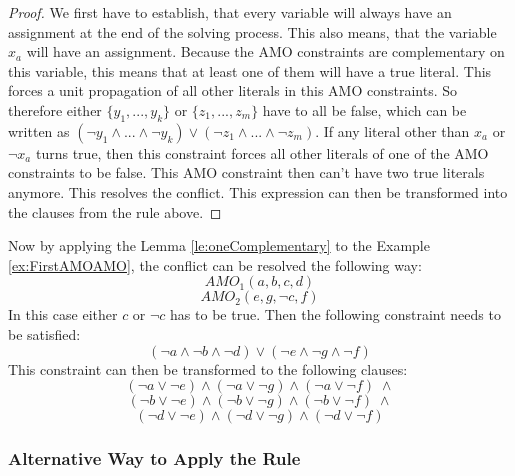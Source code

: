 \begin{proof}
We first have to establish, that every variable will always have an assignment at the end of the solving process. This also means, that the variable $x_a$ will have an assignment. Because the AMO constraints are complementary on this variable, this means that at least one of them will have a true literal. This forces a unit propagation of all other literals in this AMO constraints. So therefore either $\{y_1,...,y_k\}$ or $\{z_1,...,z_m\}$ have to all be false, which can be written as $(\neg y_1 \wedge ... \wedge \neg y_k) \vee (\neg z_1 \wedge ... \wedge \neg z_m)$. If any literal other than $x_a$ or $\neg x_a$ turns true, then this constraint forces all other literals of one of the AMO constraints to be false. This AMO constraint then can't have two true literals anymore. This resolves the conflict. This expression can then be transformed into the clauses from the rule above.
\end{proof}

Now by applying the Lemma \ref{le:oneComplementary} to the Example \ref{ex:FirstAMOAMO}, the conflict can be resolved the following way:
\begin{displaymath}
AMO_1(a,b,c,d)
\end{displaymath}
\begin{displaymath}
AMO_2(e,g,\neg c,f)
\end{displaymath}
In this case either $c$ or $\neg c$ has to be true. Then the following constraint needs to be satisfied:
\begin{displaymath}
(\neg a \wedge \neg b \wedge \neg d) \vee (\neg e \wedge \neg g \wedge \neg f)
\end{displaymath}
This constraint can then be transformed to the following clauses:
\begin{displaymath}
(\neg a \vee \neg e) \wedge (\neg a \vee \neg g) \wedge (\neg a \vee \neg f) \; \wedge
\end{displaymath}
\begin{displaymath}
(\neg b \vee \neg e) \wedge (\neg b \vee \neg g) \wedge (\neg b \vee \neg f) \; \wedge
\end{displaymath}
\begin{displaymath}
(\neg d \vee \neg e) \wedge (\neg d \vee \neg g) \wedge (\neg d \vee \neg f)
\end{displaymath}

\subsubsection{Alternative Way to Apply the Rule}

